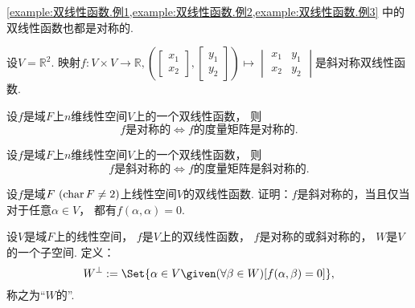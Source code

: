 \cref{example:双线性函数.例1,example:双线性函数.例2,example:双线性函数.例3} 中的双线性函数也都是对称的.

\begin{example}
设\(V = \mathbb{R}^2\).
映射\(f\colon V \times V \to \mathbb{R},
\left(
	\begin{bmatrix}
		x_1 \\
		x_2
	\end{bmatrix},
	\begin{bmatrix}
		y_1 \\
		y_2
	\end{bmatrix}
\right)
\mapsto
\begin{vmatrix}
	x_1 & y_1 \\
	x_2 & y_2
\end{vmatrix}\)是斜对称双线性函数.
\end{example}

\begin{proposition}
设\(f\)是域\(F\)上\(n\)维线性空间\(V\)上的一个双线性函数，
则\begin{equation*}
	\text{$f$是对称的}
	\iff
	\text{$f$的度量矩阵是对称的}.
\end{equation*}
\end{proposition}

\begin{proposition}
设\(f\)是域\(F\)上\(n\)维线性空间\(V\)上的一个双线性函数，
则\begin{equation*}
	\text{$f$是斜对称的}
	\iff
	\text{$f$的度量矩阵是斜对称的}.
\end{equation*}
\end{proposition}

\begin{example}
设\(f\)是域\(F\ (\operatorname{char} F\neq2)\)上线性空间\(V\)的双线性函数.
证明：\(f\)是斜对称的，当且仅当
对于任意\(\alpha \in V\)，
都有\(f(\alpha,\alpha) = 0\).
\end{example}

\begin{definition}\label{definition:双线性函数.利用双线性函数构造的正交补}
设\(V\)是域\(F\)上的线性空间，
\(f\)是\(V\)上的双线性函数，
\(f\)是对称的或斜对称的，
\(W\)是\(V\)的一个子空间.
定义：\begin{equation*}
	W^\perp
	\defeq
	\Set{
		\alpha \in V
		\given
		(\forall \beta \in W)
		[f(\alpha,\beta) = 0]
	},
\end{equation*}
称之为“\(W\)的”.
\end{definition}

